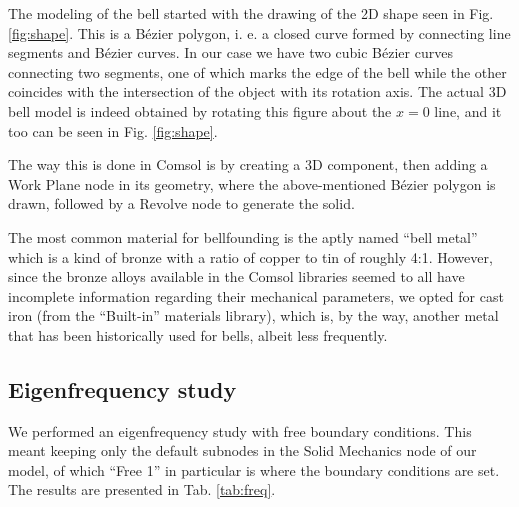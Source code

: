\documentclass[a4paper]{article}
\begin{document}
The modeling of the bell started with the drawing of the 2D shape seen in Fig. \ref{fig:shape}. This is a Bézier polygon, i. e. a closed curve formed by connecting line segments and Bézier curves. In our case we have two cubic Bézier curves connecting two segments, one of which marks the edge of the bell while the other coincides with the intersection of the object with its rotation axis. The actual 3D bell model is indeed obtained by rotating this figure about the $x=0$ line, and it too can be seen in Fig. \ref{fig:shape}.

The way this is done in Comsol is by creating a 3D component, then adding a Work Plane node in its geometry, where the above-mentioned Bézier polygon is drawn, followed by a Revolve node to generate the solid.

The most common material for bellfounding is the aptly named ``bell metal'' which is a kind of bronze with a ratio of copper to tin of roughly 4:1. However, since the bronze alloys available in the Comsol libraries seemed to all have incomplete information regarding their mechanical parameters, we opted for cast iron (from the ``Built-in'' materials library), which is, by the way, another metal that has been historically used for bells, albeit less frequently.

\subsection{Eigenfrequency study}

We performed an eigenfrequency study with free boundary conditions. This meant keeping only the default subnodes in the Solid Mechanics node of our model, of which ``Free 1'' in particular is where the boundary conditions are set. The results are presented in Tab. \ref{tab:freq}.
\end{document}
